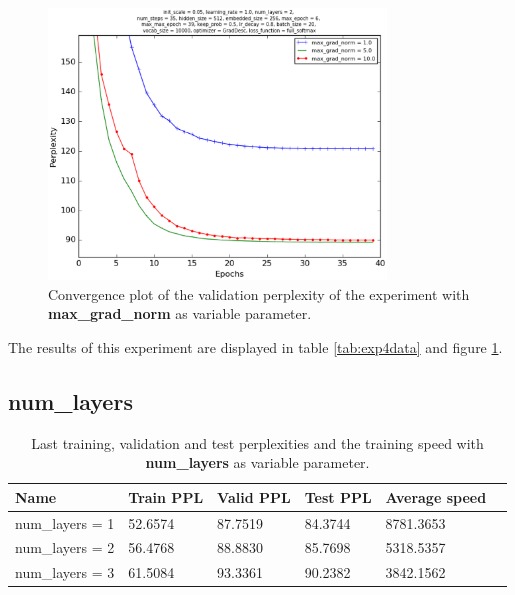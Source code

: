 \documentclass[10pt,a4paper,titlepage]{article}
\begin{document}
\begin{figure}[H]
	\begin{center}
		\includegraphics[width=0.80\textwidth]{Figures/maxgradperf.eps}
		\caption{Convergence plot of the validation perplexity of the experiment with \textbf{max\_grad\_norm} as variable parameter. }
		\label{fig:exp4perf}
	\end{center}	
\end{figure}

The results of this experiment are displayed in table \ref{tab:exp4data} and figure \ref{fig:exp4perf}.

\newpage

\subsection{num\_layers}

\begin{table}[H]
\centering
\caption{Last training, validation and test perplexities and the training speed with \textbf{num\_layers} as variable parameter.}
\label{tab:exp5data}
\begin{tabular}{|l|l|l|l|l|l|}
\hline
{\small Name} & {\small Train PPL} & {\small Valid PPL} & {\small Test PPL} & {\small Average speed}\\ \hline
{\small num\_layers = 1 }                               & 52.6574    & 87.7519    & 84.3744    & 8781.3653  \\ \hline
{\small num\_layers = 2}                                & 56.4768    & 88.8830    & 85.7698    & 5318.5357  \\ \hline
{\small num\_layers = 3}                                & 61.5084    & 93.3361    & 90.2382    & 3842.1562  \\ \hline
\end{tabular}
\end{table}
\end{document}
